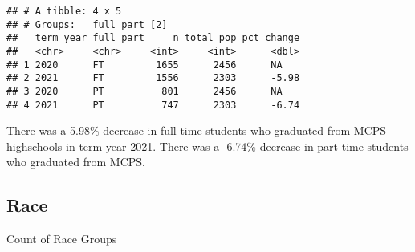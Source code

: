 \documentclass[]{article}
\newenvironment{Shaded}{\begin{snugshade}}{\end{snugshade}}
\newcommand{\CommentTok}[1]{\textcolor[rgb]{0.56,0.35,0.01}{\textit{#1}}}
\newcommand{\DataTypeTok}[1]{\textcolor[rgb]{0.13,0.29,0.53}{#1}}
\newcommand{\DecValTok}[1]{\textcolor[rgb]{0.00,0.00,0.81}{#1}}
\newcommand{\KeywordTok}[1]{\textcolor[rgb]{0.13,0.29,0.53}{\textbf{#1}}}
\newcommand{\NormalTok}[1]{#1}
\newcommand{\OperatorTok}[1]{\textcolor[rgb]{0.81,0.36,0.00}{\textbf{#1}}}
\newcommand{\OtherTok}[1]{\textcolor[rgb]{0.56,0.35,0.01}{#1}}
\newcommand{\StringTok}[1]{\textcolor[rgb]{0.31,0.60,0.02}{#1}}
\begin{document}
\begin{Shaded}
\end{Shaded}

\begin{verbatim}
## # A tibble: 4 x 5
## # Groups:   full_part [2]
##   term_year full_part     n total_pop pct_change
##   <chr>     <chr>     <int>     <int>      <dbl>
## 1 2020      FT         1655      2456      NA   
## 2 2021      FT         1556      2303      -5.98
## 3 2020      PT          801      2456      NA   
## 4 2021      PT          747      2303      -6.74
\end{verbatim}

There was a 5.98\% decrease in full time students who graduated from
MCPS highschools in term year 2021. There was a -6.74\% decrease in part
time students who graduated from MCPS.

\hypertarget{race}{%
\subsection{Race}\label{race}}

Count of Race Groups
\end{document}
